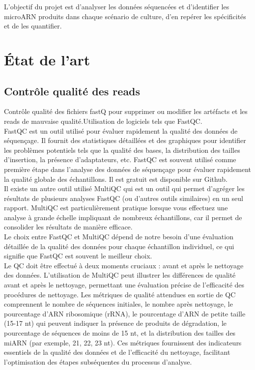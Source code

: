 \documentclass{report}
\begin{document}
L’objectif du projet est d’analyser les données séquencées et d’identifier les microARN produits dans chaque scénario de culture, d’en repérer les spécificités et de les quantifier.

\section{État de l'art}

\subsection{Contrôle qualité des reads}
Contrôle qualité des fichiers fastQ pour supprimer ou modifier les artéfacts et les reads de mauvaise qualité.Utilisation de logiciels tels que FastQC.\\

FastQC est un outil utilisé pour évaluer rapidement la qualité des données de séquençage. Il fournit des statistiques détaillées et des graphiques pour identifier les problèmes potentiels tels que la qualité des bases, la distribution des tailles d'insertion, la présence d'adaptateurs, etc.
FastQC est souvent utilisé comme première étape dans l'analyse des données de séquençage pour évaluer rapidement la qualité globale des échantillons. Il est gratuit est disponible sur Github.\cite{fastqc} \\

Il existe un autre outil utilisé MultiQC \cite{multiqc} qui est un outil qui permet d'agréger les résultats de plusieurs analyses FastQC (ou d'autres outils similaires) en un seul rapport. MultiQC est particulièrement pratique lorsque vous effectuez une analyse à grande échelle impliquant de nombreux échantillons, car il permet de consolider les résultats de manière efficace. \\

Le choix entre FastQC et MultiQC dépend de notre besoin d'une évaluation détaillée de la qualité des données pour chaque échantillon individuel, ce qui signifie que FastQC est souvent le meilleur choix.\\

Le QC doit être effectué à deux moments cruciaux : avant et après le nettoyage des données. L'utilisation de MultiQC peut illustrer les différences de qualité avant et après le nettoyage, permettant une évaluation précise de l'efficacité des procédures de nettoyage. Les métriques de qualité attendues en sortie de QC comprennent le nombre de séquences initiales, le nombre après nettoyage, le pourcentage d'ARN ribosomique (rRNA), le pourcentage d'ARN de petite taille (15-17 nt) qui peuvent indiquer la présence de produits de dégradation, le pourcentage de séquences de moins de 15 nt, et la distribution des tailles des miARN (par exemple, 21, 22, 23 nt). Ces métriques fournissent des indicateurs essentiels de la qualité des données et de l'efficacité du nettoyage, facilitant l'optimisation des étapes subséquentes du processus d'analyse. \\
\end{document}
